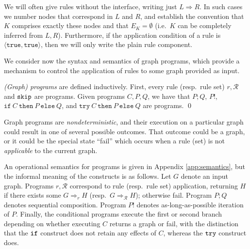 \documentclass{llncs}
\newcommand{\R}{\mathcal{R}}
\begin{document}
		We will often give rules without the interface, writing just $L\Rightarrow R$. In such cases we number nodes that correspond in $L$ and $R$, and establish the convention that $K$ comprises exactly these nodes and that $E_K = \emptyset$ (i.e.\ $K$ can be completely inferred from $L,R$). Furthermore, if the application condition of a rule is $\langle \mathtt{true},\mathtt{true} \rangle$, then we will only write the plain rule component.
		
		We consider now the syntax and semantics of graph programs, which provide a mechanism to control the application of rules to some graph provided as input.

			\begin{definition}\label{def:graph_program}\rm
				\emph{(Graph) programs} are defined inductively. First, every rule (resp.\ rule set) $r,\R$ and $\tt skip$ are programs. Given programs $C,P,Q$, we have that $P;Q$, $P!$, $\mathtt{if}\ C\ \mathtt{then}\ P\ \mathtt{else}\ Q$, and $\mathtt{try}\ C\ \mathtt{then}\ P\ \mathtt{else}\ Q$ are programs.
				\qed
			\end{definition}

			Graph programs are \emph{nondeterministic}, and their execution on a particular graph could result in one of several possible outcomes. That outcome could be a graph, or it could be the special state ``fail'' which occurs when a rule (set) is not \emph{applicable} to the current graph.

			An operational semantics for programs is given in Appendix \ref{app:semantics}, but the informal meaning of the constructs is as follows. Let $G$ denote an input graph. Programs $r, \R$ correspond to rule (resp.\ rule set) application, returning $H$ if there exists some $G\Rightarrow_r H$ (resp.\ $G\Rightarrow_\R H$); otherwise fail. Program $P;Q$ denotes sequential composition. Program $P!$ denotes as-long-as-possible iteration of $P$. Finally, the conditional programs execute the first or second branch depending on whether executing $C$ returns a graph or fail, with the distinction that the $\tt if$ construct does not retain any effects of $C$, whereas the $\tt try$ construct does.		
\end{document}
